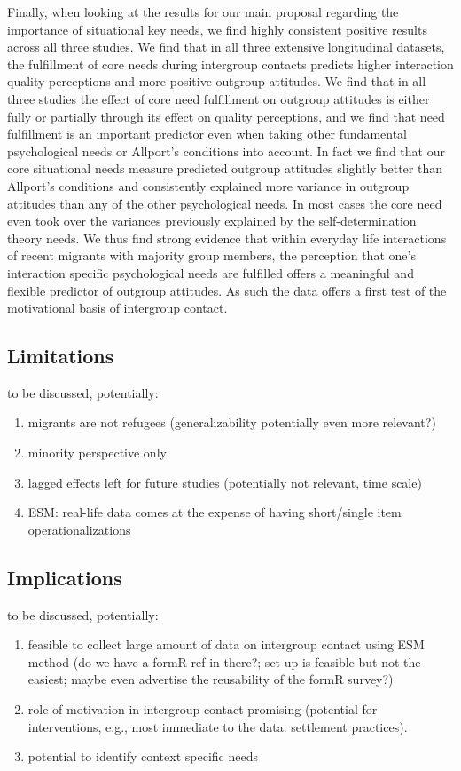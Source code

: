 \documentclass[man, 12pt, a4paper]{apa7}
\theoremstyle{break}
\theoremstyle{plain}
\begin{document}
Finally, when looking at the results for our main proposal regarding the importance of situational key needs, we find highly consistent positive results across all three studies. We find that in all three extensive longitudinal datasets, the fulfillment of core needs during intergroup contacts predicts higher interaction quality perceptions and more positive outgroup attitudes. We find that in all three studies the effect of core need fulfillment on outgroup attitudes is either fully or partially through its effect on quality perceptions, and we find that need fulfillment is an important predictor even when taking other fundamental psychological needs or Allport's conditions into account. In fact we find that our core situational needs measure predicted outgroup attitudes slightly better than Allport's conditions and consistently explained more variance in outgroup attitudes than any of the other psychological needs. In most cases the core need even took over the variances previously explained by the self-determination theory needs. We thus find strong evidence that within everyday life interactions of recent migrants with majority group members, the perception that one's interaction specific psychological needs are fulfilled offers a meaningful and flexible predictor of outgroup attitudes. As such the data offers a first test of the motivational basis of intergroup contact.

\subsection{Limitations}
to be discussed, potentially:
\begin{enumerate}
    \item migrants are not refugees (generalizability potentially even more relevant?)
    \item minority perspective only
    \item lagged effects left for future studies (potentially not relevant, time scale)
    \item ESM: real-life data comes at the expense of having short/single item operationalizations
\end{enumerate}

\subsection{Implications}
to be discussed, potentially:
\begin{enumerate}
    \item feasible to collect large amount of data on intergroup contact using ESM method (do we have a formR ref in there?; set up is feasible but not the easiest; maybe even advertise the reusability of the formR survey?)
    \item role of motivation in intergroup contact promising (potential for interventions, e.g., most immediate to the data: settlement practices). 
    \item potential to identify context specific needs
\end{enumerate}
\end{document}
